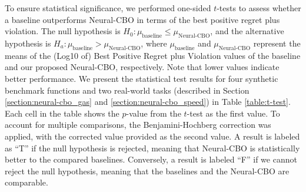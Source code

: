 To ensure statistical significance, we performed one-sided $t$-tests to assess whether a baseline outperforms Neural-CBO in terms of the best positive regret plus violation. The null hypothesis is $H_0: \mu_\text{baseline} \leq \mu_{\text{Neural-CBO}}$, and the alternative hypothesis is $H_a: \mu_\text{baseline} > \mu_{\text{Neural-CBO}}$, where $\mu_\text{baseline}$ and $\mu_{\text{Neural-CBO}}$ represent the means of the (Log10 of) Best Positive Regret plus Violation values of the baseline and our proposed Neural-CBO, respectively. Note that lower values indicate better performance. We present the statistical test results for four synthetic benchmark functions and two real-world tasks (described in Section \ref{section:neural-cbo_gas} and \ref{section:neural-cbo_speed}) in Table \ref{table:t-test}. Each cell in the table shows the $p$-value from the $t$-test as the first value. To account for multiple comparisons, the Benjamini-Hochberg correction was applied, with the corrected value provided as the second value. A result is labeled as ``T'' if the null hypothesis is rejected, meaning that Neural-CBO is statistically better to the compared baselines. Conversely, a result is labeled ``F'' if we cannot reject the null hypothesis, meaning that the baselines and the Neural-CBO are comparable.
\begin{table}[ht]
\caption{One-sided $t$-tests to evaluate whether the baseline outperforms Neural-CBO in terms of the best positive regret plus violation.}
  \vspace{0.15in}
\end{table}


